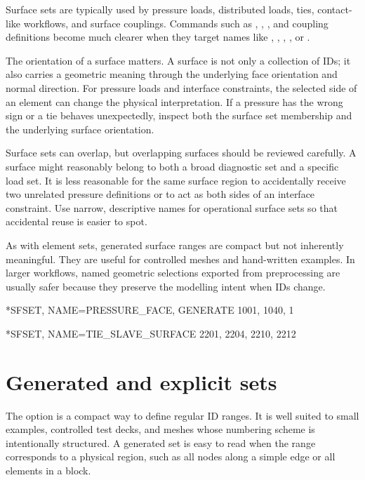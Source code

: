 Surface sets are typically used by pressure loads, distributed loads, ties, contact-like workflows, and surface couplings. Commands such as , , , and coupling definitions become much clearer when they target names like , , , , or .

The orientation of a surface matters. A surface is not only a collection of IDs; it also carries a geometric meaning through the underlying face orientation and normal direction. For pressure loads and interface constraints, the selected side of an element can change the physical interpretation. If a pressure has the wrong sign or a tie behaves unexpectedly, inspect both the surface set membership and the underlying surface orientation.

Surface sets can overlap, but overlapping surfaces should be reviewed carefully. A surface might reasonably belong to both a broad diagnostic set and a specific load set. It is less reasonable for the same surface region to accidentally receive two unrelated pressure definitions or to act as both sides of an interface constraint. Use narrow, descriptive names for operational surface sets so that accidental reuse is easier to spot.

As with element sets, generated surface ranges are compact but not inherently meaningful. They are useful for controlled meshes and hand-written examples. In larger workflows, named geometric selections exported from preprocessing are usually safer because they preserve the modelling intent when IDs change.

\begin{exampledeck}
*SFSET, NAME=PRESSURE_FACE, GENERATE
1001, 1040, 1
\end{exampledeck}

\begin{exampledeck}
*SFSET, NAME=TIE_SLAVE_SURFACE
2201, 2204, 2210, 2212
\end{exampledeck}

\clearpage

\section{Generated and explicit sets}

The  option is a compact way to define regular ID ranges. It is well suited to small examples, controlled test decks, and meshes whose numbering scheme is intentionally structured. A generated set is easy to read when the range corresponds to a physical region, such as all nodes along a simple edge or all elements in a block.

